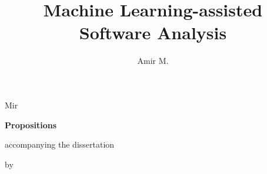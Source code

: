\documentclass{propositions}
\begin{document}
\title{Machine Learning-assisted Software Analysis}
\author{Amir M.}{Mir}

\begin{center}

{\Large\titlefont\bfseries Propositions}

\smallskip

accompanying the dissertation

\smallskip

{\makeatletter
\titlestyle\bfseries\large\@title
\makeatother}

{\makeatletter
\ifx\@subtitle\undefined\else
    \titlefont\titleshape\@subtitle
\fi
\makeatother}

\smallskip

by

\smallskip

\makeatletter
{\large\titlefont\bfseries\@firstname\ {\titleshape\@lastname}}
\makeatother

\end{center}

\end{document}
